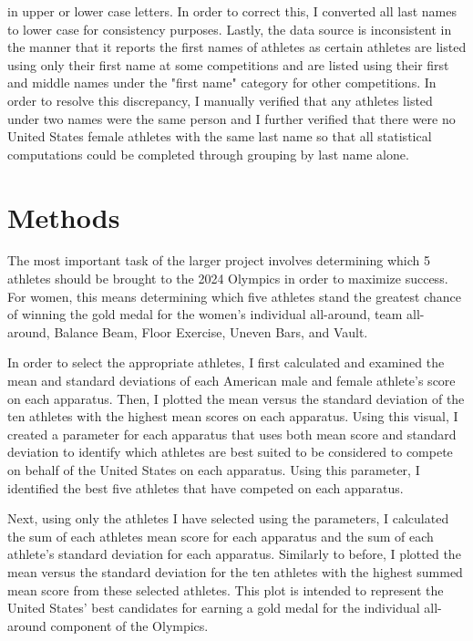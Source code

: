 \documentclass[12pt]{article}
\begin{document}
in upper or lower case letters. In order to correct this, I converted all last names to lower case for consistency 
purposes. Lastly, the data source is inconsistent in the manner that it reports the first names of athletes as certain
athletes are listed using only their first name at some competitions and are listed using their first and middle names 
under the "first name" category for other competitions. In order to resolve this discrepancy, I manually verified that 
any athletes listed under two names were the same person and I further verified that there were no United States female 
athletes with the same last name so that all statistical computations could be completed through grouping by last 
name alone.

\section{Methods}
\label{sec:meth}

The most important task of the larger project involves determining which 5 athletes
should be brought to the 2024 Olympics in order to maximize success. For women, this means determining 
which five athletes stand the greatest chance of winning the gold medal for the women's individual all-around,
team all-around, Balance Beam, Floor Exercise, Uneven Bars, and Vault.  

In order to select the appropriate athletes, I first calculated and examined the mean and standard 
deviations of each American male and female athlete's score on each apparatus. Then, I plotted the mean 
versus the standard deviation of the ten athletes with the highest mean scores on each apparatus. 
Using this visual, I created a parameter for each apparatus that uses both mean score and standard 
deviation to identify which athletes are best suited to be considered to compete on behalf of the United 
States on each apparatus. Using this parameter, I identified the best five athletes that have competed on
each apparatus. 

Next, using only the athletes I have selected using the parameters, 
I calculated the sum of each athletes mean score for each apparatus and the sum of each athlete's standard 
deviation for each apparatus. Similarly to before, I plotted the mean versus the standard deviation for the 
ten athletes with the highest summed mean score from these selected athletes. This plot is intended to represent
the United States' best candidates for earning a gold medal for the individual all-around component of the Olympics.
\end{document}
